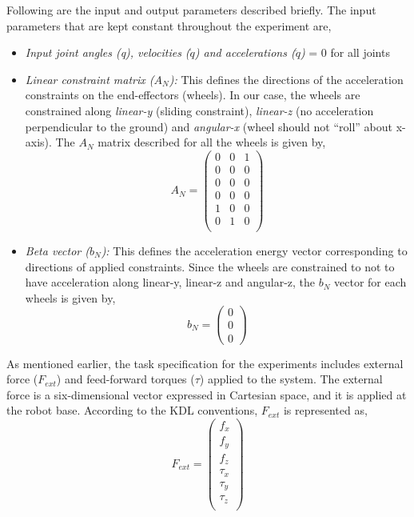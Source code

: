 Following are the input and output parameters described briefly. The input parameters that are kept constant throughout the experiment are,

\begin{itemize}
	\item \textit{Input joint angles (q), velocities ($\dot{q}$) and accelerations ($\ddot{q}$)} = 0 for all joints
	\item \textit{Linear constraint matrix ($A_N$):} This defines the directions of the acceleration constraints on the end-effectors (wheels). In our case, the wheels are constrained along \textit{linear-y} (sliding constraint), \textit{linear-z} (no acceleration perpendicular to the ground) and \textit{angular-x} (wheel should not ``roll'' about x-axis). The $A_N$ matrix described for all the wheels is given by, 
	\begin{equation}
		A_N = \begin{pmatrix}
		 0 & 0 & 1 \\
		 0 & 0 & 0 \\
		 0 & 0 & 0 \\
		 0 & 0 & 0 \\
		 1 & 0 & 0 \\
		 0 & 1 & 0 \\
		\end{pmatrix}
	\end{equation} 
	\item \textit{Beta vector ($b_N$):} This defines the acceleration energy vector corresponding to directions of applied constraints. Since the wheels are constrained to not to have acceleration along linear-y, linear-z and angular-z, the $b_N$ vector for each wheels is given by,
	\begin{equation}
		b_N = \begin{pmatrix}
		0 \\
		0 \\
		0
		\end{pmatrix}
	\end{equation}
\end{itemize}

As mentioned earlier, the task specification for the experiments includes external force ($F_{ext}$) and feed-forward torques ($\tau$) applied to the system. The external force is a six-dimensional vector expressed in Cartesian space, and it is applied at the robot base. According to the KDL conventions, $F_{ext}$ is represented as, 
\begin{equation}
	F_{ext} = \begin{pmatrix}
		f_x \\
		f_y \\
		f_z\\
		\tau_x \\
		\tau_y \\
		\tau_z\\
	\end{pmatrix}
\end{equation} 

